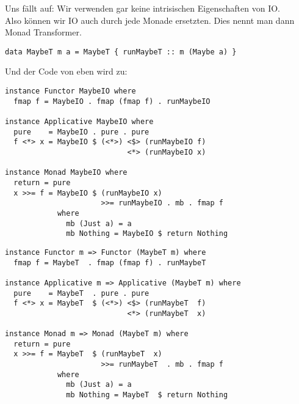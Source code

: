 \documentclass{beamer}
\begin{document}
\begin{frame}[fragile]
Uns fällt auf: Wir verwenden gar keine intrisischen Eigenschaften von IO.\\
Also können wir IO auch durch jede Monade ersetzten. Dies nennt man dann Monad Transformer.
\begin{verbatim}
data MaybeT m a = MaybeT { runMaybeT :: m (Maybe a) }
\end{verbatim}
\end{frame}

\begin{frame}[fragile]
\begin{overprint}
Und der Code von eben
wird zu:
\end{overprint}
\begin{overprint}
\begin{verbatim}
instance Functor MaybeIO where
  fmap f = MaybeIO . fmap (fmap f) . runMaybeIO

instance Applicative MaybeIO where
  pure    = MaybeIO . pure . pure
  f <*> x = MaybeIO $ (<*>) <$> (runMaybeIO f)
                            <*> (runMaybeIO x)

instance Monad MaybeIO where
  return = pure
  x >>= f = MaybeIO $ (runMaybeIO x)
                      >>= runMaybeIO . mb . fmap f
            where
              mb (Just a) = a
              mb Nothing = MaybeIO $ return Nothing
\end{verbatim}
\begin{verbatim}
instance Functor m => Functor (MaybeT m) where
  fmap f = MaybeT  . fmap (fmap f) . runMaybeT

instance Applicative m => Applicative (MaybeT m) where
  pure    = MaybeT  . pure . pure
  f <*> x = MaybeT  $ (<*>) <$> (runMaybeT  f)
                            <*> (runMaybeT  x)

instance Monad m => Monad (MaybeT m) where
  return = pure
  x >>= f = MaybeT  $ (runMaybeT  x)
                      >>= runMaybeT  . mb . fmap f
            where
              mb (Just a) = a
              mb Nothing = MaybeT  $ return Nothing
\end{verbatim}
\end{overprint}
\end{frame}
\end{document}
